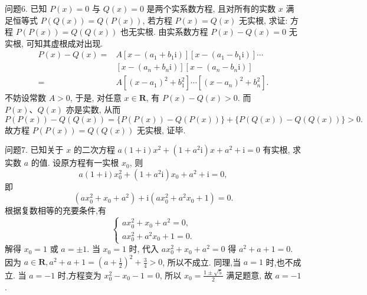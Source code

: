 问题6. 已知 $P(x)=0$ 与 $Q(x)=0$ 是两个实系数方程, 且对所有的实数 $x$ 满足恒等式 $P(Q(x))=Q(P(x))$, 若方程 $P(x)=Q(x)$ 无实根, 求证: 方程 $P(P(x))=Q(Q(x))$ 也无实根.
由实系数方程 $P(x)-Q(x)=0$ 无实根, 可知其虚根成对出现.
$$
\begin{aligned}
P(x)-Q(x)= & A\left[x-\left(a_1+b_1 \mathrm{i}\right)\right]\left[x-\left(a_1-b_1 \mathrm{i}\right)\right] \cdots \\
& {\left[x-\left(a_n+b_n \mathrm{i}\right)\right]\left[x-\left(a_n-b_n \mathrm{i}\right)\right] } \\
= & A\left[\left(x-a_1\right)^2+b_1^2\right] \cdots\left[\left(x-a_n\right)^2+b_n^2\right] .
\end{aligned}
$$
不妨设常数 $A>0$, 于是, 对任意 $x \in \mathbf{R}$, 有 $P(x)-Q(x)>0$. 而 $P(x) 、 Q(x)$ 亦是实数, 从而
$$
P(P(x))-Q(Q(x))=\{P(P(x))-Q(P(x))\}+\{P(Q(x))-Q(Q(x))\}>0 \text {. }
$$
故方程 $P(P(x))=Q(Q(x))$ 无实根, 证毕.



问题7. 已知关于 $x$ 的二次方程 $a(1+\mathrm{i}) x^2+\left(1+a^2 \mathrm{i}\right) x+a^2+\mathrm{i}=0$ 有实根, 求实数 $a$ 的值.
设原方程有一实根 $x_0$, 则
$$
a(1+\mathrm{i}) x_0^2+\left(1+a^2 \mathrm{i}\right) x_0+a^2+\mathrm{i}=0,
$$
即
$$
\left(a x_0^2+x_0+a^2\right)+\mathrm{i}\left(a x_0^2+a^2 x_0+1\right)=0 .
$$
根据复数相等的充要条件,有
$$
\left\{\begin{array}{l}
a x_0^2+x_0+a^2=0, \\
a x_0^2+a^2 x_0+1=0 .
\end{array}\right.
$$
解得 $x_0=1$ 或 $a= \pm 1$.
当 $x_0=1$ 时, 代入 $a x_0^2+x_0+a^2=0$ 得 $a^2+a+1=0$. 因为 $a \in \mathbf{R}, a^2+ a+1=\left(a+\frac{1}{2}\right)^2+\frac{3}{4}>0$, 所以不成立.
同理,当 $a=1$ 时,也不成立.
当 $a=-1$ 时,方程变为 $x_0^2-x_0-1=0$, 所以 $x_0=\frac{1 \pm \sqrt{5}}{2}$ 满足题意, 故 $a=-1$.



